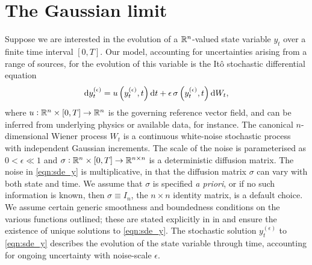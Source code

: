 \section{The Gaussian limit}\label{sec:theory}
Suppose we are interested in the evolution of a \(\mathbb{R}^n\)-valued state variable $ y_t $ over a finite time interval \([0,T]\).
Our model, accounting for uncertainties arising from a range of sources, for the evolution of this variable is the It\^o stochastic differential equation
\begin{equation}
	\dif y_t^{(\epsilon)} = u\left(y_t^{(\epsilon)}, t\right)\dif t + \epsilon \, \sigma\left(y_t^{(\epsilon)}, t\right)\dif W_t,
	\label{eqn:sde_y}
\end{equation}
where \(u: \mathbb{R}^n \times [0,T] \to \mathbb{R}^n\) is the governing reference vector field, and can be inferred from underlying physics or available data, for instance.
The canonical \(n\)-dimensional Wiener process \(W_t\)  is a continuous white-noise stochastic process with independent Gaussian increments.
The scale of the noise is parameterised as \(0 < \epsilon \ll 1\) and \(\sigma: \mathbb{R}^n \times [0,T] \to \mathbb{R}^{n\times n}\) is a deterministic diffusion matrix.
The noise in \eqref{eqn:sde_y} is multiplicative, in that the diffusion matrix \(\sigma\) can vary with both state and time.
We assume that \(\sigma\) is specified \textit{a priori}, or if no such information is known, then \(\sigma \equiv I_n\), the \(n \times n\) identity matrix, is a default choice.
We assume certain generic smoothness and boundedness conditions on the various functions outlined; these are stated explicitly in  in  and ensure the existence of unique solutions to \eqref{eqn:sde_y}.
The stochastic solution \(y_t^{(\epsilon)}\) to \eqref{eqn:sde_y} describes the evolution of the state variable through time, accounting for ongoing uncertainty with noise-scale \(\epsilon\).

